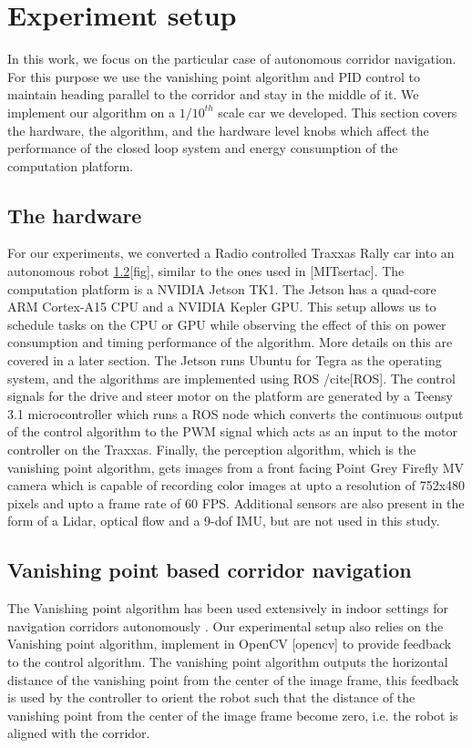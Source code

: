 \section{Experiment setup}

In this work, we focus on the particular case of autonomous corridor navigation. For this purpose we use the vanishing point algorithm and PID control to maintain heading parallel to the corridor and stay in the middle of it. We implement our algorithm on a $1/10^{th}$ scale car we developed. This section covers the hardware, the algorithm, and the hardware level knobs which affect the performance of the closed loop system and energy consumption of the computation platform.

\subsection{The hardware}

For our experiments, we converted a Radio controlled Traxxas Rally car into an autonomous robot \ref{}[fig], similar to the ones used in \cite{}[MITsertac]. The computation platform is a NVIDIA Jetson TK1. The Jetson has a quad-core ARM Cortex-A15 CPU and a NVIDIA Kepler GPU. This setup allows us to schedule tasks on the CPU or GPU while observing the effect of this on power consumption and timing performance of the algorithm. More details on this are covered in a later section. The Jetson runs Ubuntu for Tegra as the operating system, and the algorithms are implemented using ROS /cite{}[ROS]. The control signals for the drive and steer motor on the platform are generated by a Teensy 3.1 microcontroller which runs a ROS node which converts the continuous output of the control algorithm to the PWM signal which acts as an input to the motor controller on the Traxxas. Finally, the perception algorithm, which is the vanishing point algorithm, gets images from a front facing Point Grey Firefly MV camera which is capable of recording color images at upto a resolution of 752x480 pixels and upto a frame rate of 60 FPS. Additional sensors are also present in the form of a Lidar, optical flow and a 9-dof IMU, but are not used in this study.

\subsection{Vanishing point based corridor navigation}

The Vanishing point algorithm \cite{VP1} has been used extensively in indoor settings for navigation corridors autonomously \cite{VP2, VP3}. Our experimental setup also relies on the Vanishing point algorithm, implement in OpenCV \cite{}[opencv] to provide feedback to the control algorithm. The vanishing point algorithm outputs the horizontal distance of the vanishing point from the center of the image frame, this feedback is used by the controller to orient the robot such that the distance of the vanishing point from the center of the image frame become zero, i.e. the robot is aligned with the corridor. 

